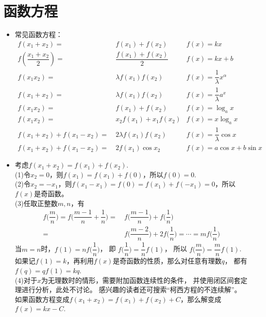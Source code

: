\begin{itemize}[leftmargin=\inteval{\myitemleftmargin}pt,itemsep=
   \inteval{\myitemitempsep}pt,topsep=\inteval{\myitemtopsep}pt]
\end{itemize}

\section{函数方程}
\begin{itemize}[leftmargin=\inteval{\myitemleftmargin}pt,itemsep=
   \inteval{\myitemitempsep}pt,topsep=\inteval{\myitemtopsep}pt]
\item 常见函数方程：
\begin{align*}
    f(x_1+x_2)=&\ f(x_1)+f(x_2)   	& f(x)=kx  \\
    f\left(\dfrac{x_1+x_2}{2}\right) =&\ \dfrac{f(x_1)+f(x_2)}{2}  & f(x)=kx+b \\
    f(x_1x_2)=&\ \lambda f(x_1)f(x_2)   	 
                        &  f(x)=\dfrac{1}{\lambda} x^{\alpha} \\
    f(x_1+x_2)=&\ \lambda f(x_1)f(x_2)   
                        & f(x)=\dfrac{1}{\lambda} a^x \\
    f(x_1x_2)=&\ f(x_1)+f(x_2)   	& f(x)=\log_{a}x \\
    f(x_1x_2)=&\ x_2f(x_1)+x_1f(x_2)   	& f(x)=x\log_{a}x \\
    f(x_1+x_2)+f(x_1-x_2)=&\ 2\lambda f(x_1)f(x_2) & f(x)=\dfrac{1}{\lambda}\cos x \\
    f(x_1+x_2)+f(x_1-x_2)=&\ 2f(x_1)\cos x_2	& f(x)=a\cos x+b\sin x   
\end{align*}

\item 考虑$ f(x_1+x_2)=f(x_1)+f(x_2) $. \\
(1)令$ x_2=0 $，则$ f(x_1)=f(x_1)+f(0) $，所以$ f(0)=0 $. \\
(2)令$ x_2=-x_1 $，则$ f(x_1-x_1)=f(0)=f(x_1)+f(-x_1)=0 $，所以$ f(x) $是奇函数。\\
(3)任取正整数$ m,n $，有
\begin{align*}
    f\Big(\dfrac{m}{n}\Big)=f\Big(\dfrac{m-1}{n}+\dfrac{1}{n}\Big)
    =&\ f\Big(\dfrac{m-1}{n}\Big)+f\Big(\dfrac{1}{n}\Big) \\
    =&\ f\Big(\dfrac{m-2}{n}\Big)+2f\Big(\dfrac{1}{n}\Big)=
    \cdots =mf\Big(\dfrac{1}{n}\Big)
\end{align*}
当$ m=n $时，$ f(1)=nf\Big(\dfrac{1}{n}\Big) $，
即 $ f\Big(\dfrac{1}{n}\Big)=\dfrac{1}{n}f(1) $，
所以 $f\Big(\dfrac{m}{n}\Big)=\dfrac{m}{n}f(1) $. 
如果记$ f(1)=k $，再利用$ f(x) $是奇函数的性质，那么对任意有理数$ q $，
都有$ f(q)=qf(1)=kq $. \\
(4)对于$ x $为无理数时的情形，需要附加函数连续性的条件，
并使用闭区间套定理进行分析，此处不讨论。
感兴趣的读者还可搜索“柯西方程的不连续解”。\\
如果函数方程变成$ f(x_1+x_2)=f(x_1)+f(x_2)+C $，那么解变成
$f(x)=kx-C$. 


\end{itemize}
